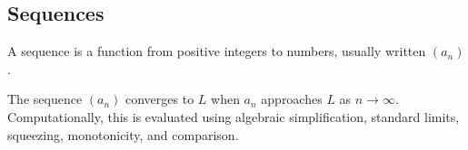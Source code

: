 \subsection*{Sequences}

\begin{definition*}[Sequence]
A sequence is a function from positive integers to numbers, usually written
\((a_n)\).
\end{definition*}

\begin{definition*}
The sequence \((a_n)\) converges to \(L\) when \(a_n\) approaches \(L\) as
\(n\to\infty\). Computationally, this is evaluated using algebraic
simplification, standard limits, squeezing, monotonicity, and comparison.
\end{definition*}
